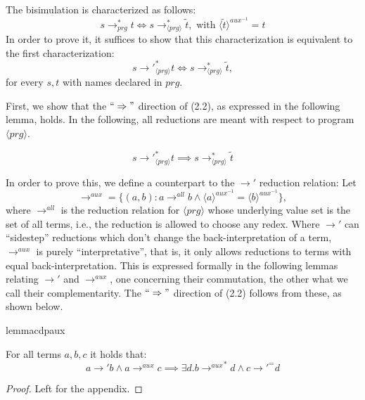 The bisimulation is characterized as follows:
\[
s {\longrightarrow}_{prg}^* t \iff s \longrightarrow^*_{\langle prg \rangle} \widetilde{t}, \text{ with } \langle \widetilde{t} \rangle^{aux^{-1}} = t
\]
In order to prove it, it suffices to show that this characterization is equivalent to the first characterization:
\begin{equation}
s {\longrightarrow'}_{\langle prg \rangle}^* t \iff s \longrightarrow^*_{\langle prg \rangle} \widetilde{t},
\end{equation}
for every $s, t$ with names declared in $prg$.

First, we show that the $`` \Rightarrow "$ direction of (2.2), as expressed in the following lemma, holds. In the following, all reductions are meant with respect to program $\langle prg \rangle$.

\begin{lemma}
\[
s {\longrightarrow'}_{\langle prg \rangle}^* t \implies s \longrightarrow^*_{\langle prg \rangle} \widetilde{t}
\]
\end{lemma}

In order to prove this, we define a counterpart to the $\longrightarrow'$ reduction relation: Let
\[
\longrightarrow^{aux} = \{(a,b) : a \longrightarrow^{all} b \land \langle a \rangle^{aux^{-1}} = \langle b \rangle^{aux^{-1}}\},
\]
where $\longrightarrow^{all}$ is the reduction relation for $\langle prg \rangle$ whose underlying value set is the set of all terms, i.e., the reduction is allowed to choose any redex. Where $\longrightarrow'$ can ``sidestep'' reductions which don't change the back-interpretation of a term, $\longrightarrow^{aux}$ is purely ``interpretative'', that is, it only allows reductions to terms with equal back-interpretation. This is expressed formally in the following lemmas relating $\longrightarrow'$ and $\longrightarrow^{aux}$, one concerning their commutation, the other what we call their complementarity. The $`` \Rightarrow "$ direction of (2.2) follows from these, as shown below.

\begin{restatable}{lemma}{cdpaux}

For all terms $a,b,c$ it holds that:
\[
a {\longrightarrow'} b \land a \longrightarrow^{aux} c \implies \exists d . b {\longrightarrow^{aux}}^* d \land c {\longrightarrow'}^= d
\]

\end{restatable}
\begin{proof}
Left for the appendix.
\end{proof}

